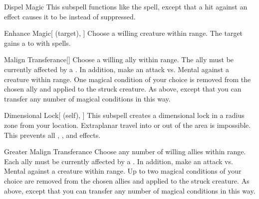 \begin{ability}[\nth{2}]{Dispel Magic}
This subspell functions like the  spell, except that a hit against an effect causes it to be  instead of suppressed.
\end{ability}
\vspace{0.25em}



\begin{ability}[\nth{2}]{Enhance Magic}[ (target), ]
Choose a willing creature within \rngmed range.
The target gains a   to  with spells.
\end{ability}
\vspace{0.25em}



\begin{ability}[\nth{2}]{Malign Transferance}[]
Choose a willing ally within \rngmed range.
The ally must be currently affected by a  .
In addition, make an attack vs. Mental against a creature within \rngmed range.
\hit One magical condition of your choice is removed from the chosen ally and applied to the struck creature.
\crit As above, except that you can transfer any number of magical conditions in this way.
\end{ability}
\vspace{0.25em}



\begin{ability}[\nth{4}]{Dimensional Lock}[ (self), ]
This subspell creates a dimensional lock in a \arealarge radius zone from your location.
Extraplanar travel into or out of the area is impossible.
This prevents all , , and  effects.
\end{ability}
\vspace{0.25em}



\begin{ability}[\nth{5}]{Greater Malign Transferance}
Choose any number of willing allies within \rngmed range.
Each ally must be currently affected by a  .
In addition, make an attack vs. Mental against a creature within \rngmed range.
\hit Up to two magical conditions of your choice are removed from the chosen allies and applied to the struck creature.
\crit As above, except that you can transfer any number of magical conditions in this way.
\end{ability}
\vspace{0.25em}



